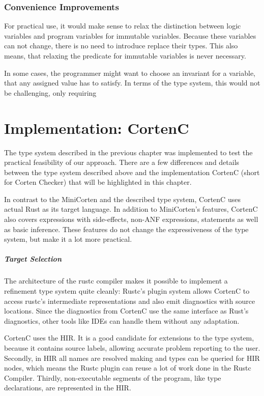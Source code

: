 \documentclass[twoside, english]{sdqthesis}
\theoremstyle{definition}
\begin{document}
\subsection{Convenience Improvements}

For practical use, it would make sense to relax the distinction between logic variables and program variables for immutable variables. Because these variables can not change, there is no need to introduce replace their types. This also means, that relaxing the predicate for immutable variables is never necessary.

In some cases, the programmer might want to choose an invariant for a variable, that any assigned value has to satisfy. In terms of the type system, this would not be challenging, only requiring 

\chapter{Implementation: CortenC} \label{ch:implementation}

The type system described in the previous chapter was implemented to test the practical feasibility of our approach.
There are a few differences and details between the type system described above and the implementation CortenC (short for Corten Checker) that will be highlighted in this chapter.

In contrast to the MiniCorten and the described type system, CortenC uses actual Rust as its target language. In addition to MiniCorten's features, CortenC also covers expressions with side-effects, non-ANF expressions, statements as well as basic inference.
These features do not change the expressiveness of the type system, but make it a lot more practical.

\paragraph{Target Selection}
The architecture of the rustc compiler makes it possible to implement a refinement type system quite cleanly: Rustc's plugin system allows CortenC to access rustc's intermediate representations and also emit diagnostics with source locations. Since the diagnostics from CortenC use the same interface as Rust's diagnostics, other tools like IDEs can handle them without any adaptation.

CortenC uses the HIR. It is a good candidate for extensions to the type system, because it contains source labels, allowing accurate problem reporting to the user. Secondly, in HIR all names are resolved making and types can be queried for HIR nodes, which means the Rustc plugin can reuse a lot of work done in the Rustc Compiler. Thirdly, non-executable segments of the program, like type declarations, are represented in the HIR.
\end{document}
